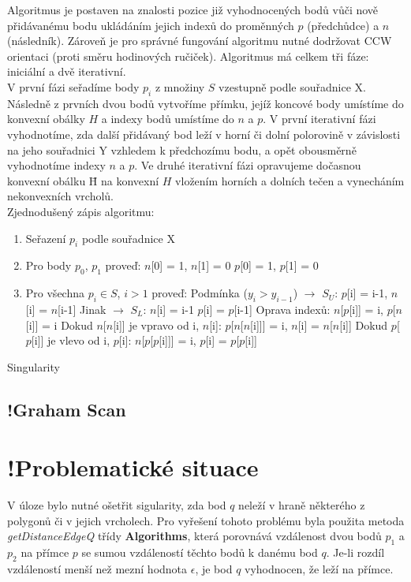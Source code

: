 \documentclass[a4paper, 12pt]{article}
\begin{document}
Algoritmus je postaven na znalosti pozice již vyhodnocených bodů vůči nově přidá\-vanému bodu ukládáním jejich indexů do proměnných $p$ (předchůdce) a $n$ (následník). Zároveň je pro správné fungování algoritmu nutné dodržovat CCW orientaci (proti směru hodinových ručiček). Algoritmus má celkem tři fáze: iniciální a dvě iterativní.\\

V první fázi seřadíme body $p_i$ z množiny $S$ vzestupně podle souřadnice X. Následně z prvních dvou bodů vytvoříme přímku, jejíž koncové body umístíme do konvexní obálky $H$ a indexy bodů umístíme do $n$ a $p$. V první iterativní fázi vyhodnotíme, zda další přidávaný bod leží v horní či dolní polorovině v závislosti na jeho souřadnici Y vzhledem k předchozímu bodu, a opět obousměrně vyhodnotíme indexy $n$ a $p$. Ve druhé iterativní fázi opravujeme dočasnou konvexní obálku \={H} na konvexní $H$ vložením horních a dolních tečen a vynecháním nekonvexních vrcholů.\\

Zjednodušený zápis algoritmu: 
\begin{enumerate}
\item Seřazení $p_i$ podle souřadnice X
\item Pro body $p_0$, $p_1$ proveď:
\subitem $n$[0] = 1, $n$[1] = 0
\subitem $p$[0] = 1, $p$[1] = 0
\item Pro všechna $p_i \in S$, $i > 1$ proveď:
\subitem Podmínka ($y_i > y_{i-1}$) $\rightarrow$ $S_U$: $p$[i] = i-1, $n$[i] = $n$[i-1]
\subitem Jinak $\rightarrow$ $S_L$: $n$[i] = i-1 $p$[i] = $p$[i-1]
\subitem Oprava indexů: $n$[$p$[i]] = i, $p$[$n$[i]] = i
\subitem Dokud $n$[$n$[i]] je vpravo od i, $n$[i]:
\subsubitem $p$[$n$[$n$[i]]] = i, $n$[i] = $n$[$n$[i]]
\subitem Dokud $p$[$p$[i]] je vlevo od i, $p$[i]:
\subsubitem $n$[$p$[$p$[i]]] = i, $p$[i] = $p$[$p$[i]]
\end{enumerate}

Singularity

\subsection{!Graham Scan}

\section{!Problematické situace}
V úloze bylo nutné ošetřit sigularity, zda bod $q$ neleží v hraně některého z polygonů či v jejich vrcholech. Pro vyřešení tohoto problému byla použita metoda \textsl{getDistanceEdgeQ} třídy \textbf{Algorithms}, která porovnává vzdálenost dvou bodů $p_1$ a $p_2$ na přímce $p$ se sumou vzdáleností těchto bodů k danému bod $q$. Je-li rozdíl vzdáleností menší než mezní hodnota $\epsilon$, je bod $q$ vyhodnocen, že leží na přímce.\\
\end{document}
